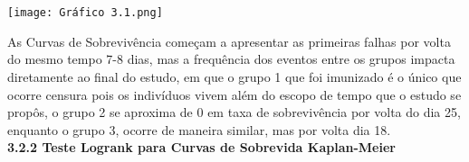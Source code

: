 \documentclass[12pt,a4paper]{article}
\begin{document}
\begin{center}
{\begin{tabular}{ccccccc}
		\end{tabular}
		}
		\vspace{1cm}\\
		\vspace{1cm}\\
		\texttt{[image: Gráfico 3.1.png]}\\
	\end{center}
	\vspace{1cm}
	As Curvas de Sobrevivência começam a apresentar as primeiras falhas por volta do mesmo tempo 7-8 dias, mas a frequência dos eventos entre os grupos impacta diretamente ao final do estudo, em que o grupo 1 que foi imunizado é o único que ocorre censura pois os indivíduos vivem além do escopo de tempo que o estudo se propôs, o grupo 2 se aproxima de 0 em taxa de sobrevivência por volta do dia 25, enquanto o grupo 3, ocorre de maneira similar, mas por volta dia 18.
	\vspace{1cm}\\
	\textbf{3.2.2 Teste Logrank para Curvas de Sobrevida Kaplan-Meier}
	\vspace{0.5cm}\\
\end{document}
